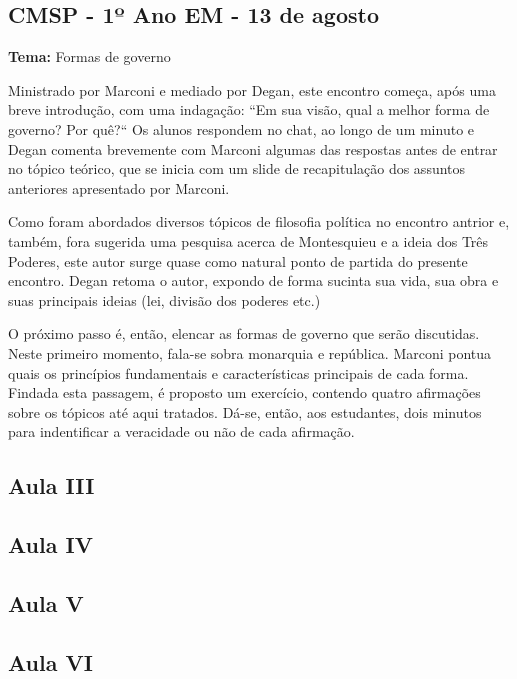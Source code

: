 \documentclass[12pt,a4paper]{article}
\begin{document}
	\subsection{CMSP - 1º Ano EM - 13 de agosto}

	\textbf{Tema:} Formas de governo

	Ministrado por Marconi e mediado por Degan, este encontro começa, 
	após uma breve introdução, com uma indagação: “Em sua visão, qual a 
	melhor forma de governo? Por quê?“ Os alunos respondem no chat, 
	ao longo de um minuto e Degan comenta brevemente com Marconi algumas 
	das respostas antes de entrar no tópico teórico, que se inicia com 
	um slide de recapitulação dos assuntos anteriores apresentado por 
	Marconi. 

	Como foram abordados diversos tópicos de filosofia política no 
	encontro antrior e, também, fora sugerida uma pesquisa acerca de 
	Montesquieu e a ideia dos Três Poderes, este autor surge quase 
	como natural ponto de partida do presente encontro. Degan retoma 
	o autor, expondo de forma sucinta sua vida, sua obra e suas 
	principais ideias (lei, divisão dos poderes etc.) 

	O próximo passo é, então, elencar as formas de governo que serão 
	discutidas. Neste primeiro momento, fala-se sobra monarquia e 
	república. Marconi pontua quais os princípios fundamentais e 
	características principais de cada forma. Findada esta passagem, 
	é proposto um exercício, contendo quatro afirmações sobre os 
	tópicos até aqui tratados. Dá-se, então, aos estudantes, dois 
	minutos para indentificar a veracidade ou não de cada afirmação. 



	\subsection{Aula III}

	\subsection{Aula IV}

	\subsection{Aula V}

	\subsection{Aula VI}
	
\end{document}
